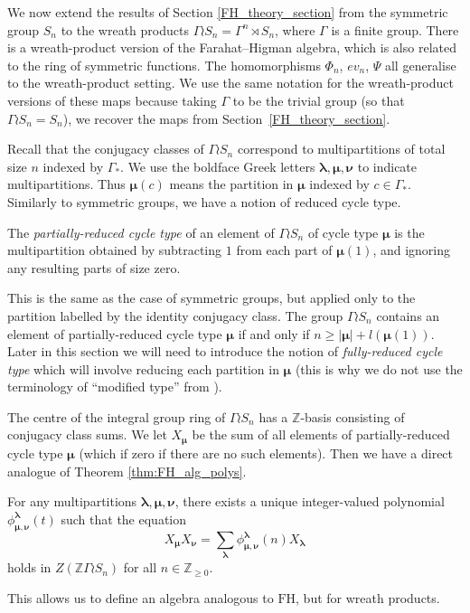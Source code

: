 \documentclass[ALCO,Unicode]{cedram}
\newcommand{\bs}{\boldsymbol}
\newcommand{\FH}{\mathrm{FH}}
\newcommand{\FH}{\mathrm{FH}}
\begin{document}
We now extend the results of Section \ref{FH_theory_section} from the symmetric group $S_n$ to the wreath products $\Gamma \wr S_n = \Gamma ^n \rtimes S_n$, where $\Gamma$ is a finite group. There is a wreath-product version of the Farahat--Higman algebra, which is also related to the ring of symmetric functions. The homomorphisms $\Phi_n$, $ev_n$, $\Psi$ all generalise to the wreath-product setting. We use the same notation for the wreath-product versions of these maps because taking $\Gamma$ to be the trivial group (so that $\Gamma \wr S_n = S_n$), we recover the maps from Section~\ref{FH_theory_section}.

Recall that the conjugacy classes of $\Gamma \wr S_n$ correspond to multipartitions of total size $n$ indexed by $\Gamma_*$. We use the boldface Greek letters $\bs \lambda, \bs \mu, \bs \nu$ to indicate multipartitions. Thus $\bs{\mu}(c)$ means the partition in $\bs \mu$ indexed by $c \in \Gamma_*$. Similarly to symmetric groups, we have a notion of reduced cycle type. 
\begin{definition}
The \emph{partially-reduced cycle type} of an element of $\Gamma \wr S_n$ of cycle type $\bs{\mu}$ is the multipartition obtained by subtracting $1$ from each part of $\bs \mu(1)$, and ignoring any resulting parts of size zero. 
\end{definition}

This is the same as the case of symmetric groups, but applied only to the partition labelled by the identity conjugacy class. The group $\Gamma \wr S_n$ contains an element of partially-reduced cycle type $\bs \mu$ if and only if $n \geq |\bs \mu| + l(\bs \mu(1))$. Later in this section we will need to introduce the notion of \emph{fully-reduced cycle type} which will involve reducing each partition in $\bs \mu$ (this is why we do not use the terminology of ``modified type'' from \cite{Wang1}).

The centre of the integral group ring of $\Gamma \wr S_n$ has a $\mathbb{Z}$-basis consisting of conjugacy class sums. We let $X_{\bs \mu}$ be the sum of all elements of partially-reduced cycle type $\bs \mu$ (which if zero if there are no such elements). Then we have a direct analogue of Theorem \ref{thm:FH_alg_polys}.

\begin{theorem} \label{FH_g_alg_polys_thm}
For any multipartitions $\bs \lambda, \bs\mu, \bs\nu$, there exists a unique integer-valued polynomial $\phi_{\bs\mu, \bs\nu}^{\bs\lambda}(t)$ such that the equation
\[
X_{\bs\mu} X_{\bs\nu} = \sum_{\bs\lambda} \phi_{\bs\mu, \bs\nu}^{\bs\lambda}(n)X_{\bs\lambda}
\]
holds in $Z(\mathbb{Z} \Gamma \wr S_n)$ for all $n \in \mathbb{Z}_{\geq 0}$.
\end{theorem}
This allows us to define an algebra analogous to $\FH$, but for wreath products.
\end{document}
